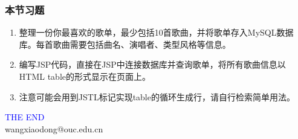 \begin{frame}
  \frametitle{本节习题}
  

  \begin{enumerate}
  \item 整理一份你最喜欢的歌单，最少包括10首歌曲，并将歌单存入MySQL数据库。每首歌曲需要包括曲名、演唱者、类型风格等信息。
  \item 编写JSP代码，直接在JSP中连接数据库并查询歌单，将所有歌曲信息以HTML table的形式显示在页面上。
  \item 注意可能会用到JSTL标记实现table的循环生成行，请自行检索简单用法。
  \end{enumerate}
\end{frame}
\begin{frame}
\centering
{\Huge \textcolor{blue}{THE END}} \\
\vspace{5mm}
{\Large wangxiaodong@ouc.edu.cn} \\
\end{frame}
